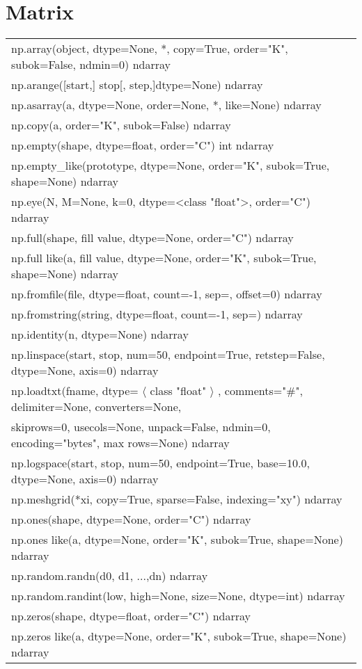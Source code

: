 \graphicspath{ {./pics/Matrix/} }

\section*{Matrix}
\hspace{1cm}
\begin{tabular}{|l|}
 	\hline
	 np.array(object, dtype=None, *, copy=True, order="K", subok=False, ndmin=0) ndarray
	 \\ np.arange([start,] stop[, step,]dtype=None) ndarray
	 \\ np.asarray(a, dtype=None, order=None, *, like=None) ndarray
	 \\ np.copy(a, order="K", subok=False) ndarray
	 \\ np.empty(shape, dtype=float, order="C") int ndarray
	 \\ np.empty\_like(prototype, dtype=None, order="K", subok=True, shape=None) ndarray
	 \\ np.eye(N, M=None, k=0, dtype=<class "float">, order="C") ndarray
	 \\ np.full(shape, fill value, dtype=None, order="C") ndarray
	 \\ np.full like(a, fill value, dtype=None, order="K", subok=True, shape=None) ndarray
	 \\ np.fromfile(file, dtype=float, count=-1, sep=, offset=0) ndarray
	 \\ np.fromstring(string, dtype=float, count=-1, sep=) ndarray
	 \\ np.identity(n, dtype=None) ndarray
	 \\ np.linspace(start, stop, num=50, endpoint=True, retstep=False, dtype=None, axis=0) ndarray
	 \\ np.loadtxt(fname, dtype= $\langle$ class "float" $\rangle$ , comments="\#", delimiter=None, converters=None,
	 \\ skiprows=0,  usecols=None, unpack=False, ndmin=0, encoding="bytes", max rows=None) ndarray
	 \\ np.logspace(start, stop, num=50, endpoint=True, base=10.0, dtype=None, axis=0) ndarray
	 \\ np.meshgrid(*xi, copy=True, sparse=False, indexing="xy") ndarray
	 \\ np.ones(shape, dtype=None, order="C") ndarray
	 \\ np.ones like(a, dtype=None, order="K", subok=True, shape=None) ndarray
	 \\ np.random.randn(d0, d1, ...,dn) ndarray
	 \\ np.random.randint(low, high=None, size=None, dtype=int) ndarray
	 \\ np.zeros(shape, dtype=float, order="C") ndarray
	 \\ np.zeros like(a, dtype=None, order="K", subok=True, shape=None) ndarray
	\\\hline
\end{tabular}
